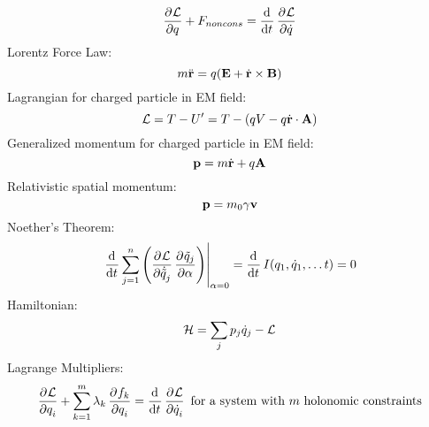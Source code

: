 \begin{equation}
    \dpd{\LL}{q} + F_{noncons} = \dod{}{t}\dpd{\LL}{\dot{q}}   
\end{equation}
Lorentz Force Law:
\begin{equation}
    m\ddot{\mathbf{r}} = q(\mathbf{E} + \dot{\mathbf{r}} \times \mathbf{B})
\end{equation}
Lagrangian for charged particle in EM field:
\begin{equation}
    \mathcal{L} = T - U' = T - (qV - q\dot{\mathbf{r}}\cdot \mathbf{A})
\end{equation}
Generalized momentum for charged particle in EM field:
\begin{equation}
    \mathbf{p} = m\dot{\mathbf{r}} + q\mathbf{A}
\end{equation}
Relativistic spatial momentum:
\begin{equation}
    \mathbf{p} = m_0\gamma \mathbf{v}
\end{equation}
Noether's Theorem:
\begin{equation}
    \left.\dod{}{t}\sum_{j=1}^n\left(\dpd{\LL}{\dot{\tilde{q}}_j}\dpd{\tilde{q}_j}{\alpha}\right)\right|_{\alpha=0} = \dod{}{t}I(q_1, \dot{q}_1, \ldots t) = 0
\end{equation}
Hamiltonian:
\begin{equation}
    \mathcal{H} = \sum_j p_j\dot{q}_j - \mathcal{L}
\end{equation}
Lagrange Multipliers:
\begin{equation}
    \dpd{\LL}{q_i} + \sum_{k=1}^m\lambda_k \dpd{f_k}{q_i} = \dod{}{t}\dpd{\LL}{\dot{q}_i} \text{ for a system with $m$ holonomic constraints}
\end{equation}
